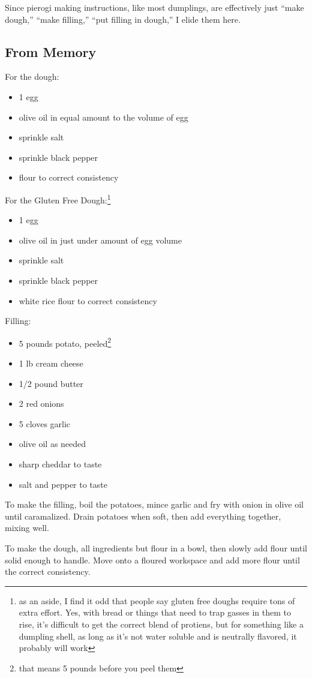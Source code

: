 \documentclass[12pt]{article}[titlepage]
\newcommand{\say}[1]{``#1''}
\newcommand{\1}{\={a}}
\newcommand{\2}{\={e}}
\newcommand{\3}{\={\i}}
\newcommand{\4}{\=o}
\newcommand{\5}{\=u}
\newcommand{\6}{\={A}}
\renewcommand{\,}{\textsuperscript{,}}
\begin{document}
Since pierogi making instructions, like most dumplings, are effectively just \say{make dough,} \say{make filling,} \say{put filling in dough,} I elide them here.

\subsection{From Memory}
For the dough:
\begin{itemize}
    \item 1 egg
    \item olive oil in equal amount to the volume of egg
    \item sprinkle salt
    \item sprinkle black pepper
    \item flour to correct consistency
\end{itemize}

For the Gluten Free Dough:\footnote{as an aside, I find it odd that people say gluten free doughs require tons of extra effort.
Yes, with bread or things that need to trap gasses in them to rise, it's difficult to get the correct blend of protiens, but for something like a dumpling shell, as long as it's not water soluble and is neutrally flavored, it probably will work}
\begin{itemize}
    \item 1 egg
    \item olive oil in just under amount of egg volume
    \item sprinkle salt
    \item sprinkle black pepper
    \item white rice flour to correct consistency
\end{itemize}

Filling:
\begin{itemize}
    \item 5 pounds potato, peeled\footnote{that means 5 pounds before you peel them}
    \item 1 lb cream cheese
    \item 1/2 pound butter
    \item 2 red onions
    \item 5 cloves garlic
    \item olive oil as needed
    \item sharp cheddar to taste
    \item salt and pepper to taste
\end{itemize}

To make the filling, boil the potatoes, mince garlic and fry with onion in olive oil until caramalized.
Drain potatoes when soft, then add everything together, mixing well.

To make the dough, all ingredients but flour in a bowl, then slowly add flour until solid enough to handle.
Move onto a floured workspace and add more flour until the correct consistency.
\end{document}
